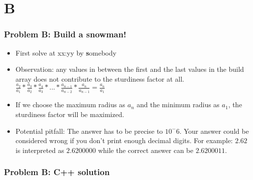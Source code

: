 \section{B}%
\label{sec:B}

\begin{frame}
  \frametitle{Problem B: Build a snowman!}
  \begin{itemize}
    \item First solve at xx:yy by \textbf somebody
    \item Observation: any values in between the first and the last values in the build array does not contribute to the sturdiness factor at all.\\
    $\frac{a_2}{a_1} * \frac{a_3}{a_2} * \frac{a_4}{a_3} * ... * \frac{a_{n-1}}{a_{n-2}} * \frac{a_n}{a_{n-1}} = \frac{a_n}{a_1}$
    \item If we choose the maximum radius as $a_n$ and the minimum radius as $a_1$, the sturdiness factor will be maximized.
    \item Potential pitfall: The answer has to be precise to $10^-6$. Your answer could be considered wrong if you don't print enough decimal digits. For example: $2.62$ is interpreted as $2.6200000$ while the correct answer can be $2.6200011$.
  \end{itemize}
\end{frame}


\begin{frame}
	\frametitle{Problem B: C++ solution}
\end{frame}
